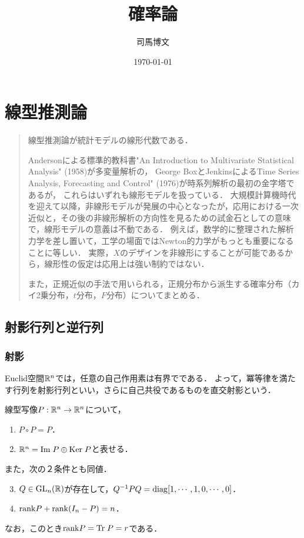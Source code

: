 \documentclass[uplatex,dvipdfmx]{jsreport}
\title{確率論}
\author{司馬博文}
\date{\today}
\begin{document}
\tableofcontents

\chapter{線型推測論}

\begin{quotation}
    線型推測論が統計モデルの線形代数である．

    Andersonによる標準的教科書"An Introduction to Multivariate Statistical Analysis" (1958)が多変量解析の，
    George BoxとJenkinsによるTime Series Analysis, Forecasting and Control" (1976)が時系列解析の最初の金字塔であるが，
    これらはいずれも線形モデルを扱っている．
    大規模計算機時代を迎えて以降，非線形モデルが発展の中心となったが，応用における一次近似と，その後の非線形解析の方向性を見るための試金石としての意味で，線形モデルの意義は不動である．
    例えば，数学的に整理された解析力学を差し置いて，工学の場面ではNewton的力学がもっとも重要になることに等しい．
    実際，$X$のデザインを非線形にすることが可能であるから，線形性の仮定は応用上は強い制約ではない．

    また，正規近似の手法で用いられる，正規分布から派生する確率分布（カイ2乗分布，$t$分布，$F$分布）についてまとめる．
\end{quotation}

\section{射影行列と逆行列}

\subsection{射影}

\begin{tcolorbox}[colframe=ForestGreen, colback=ForestGreen!10!white,breakable,colbacktitle=ForestGreen!40!white,coltitle=black,fonttitle=\bfseries\sffamily,
title=]
    Euclid空間$\mathbb{R}^n$では，任意の自己作用素は有界でである．
    よって，冪等律を満たす行列を射影行列といい，さらに自己共役であるものを直交射影という．
\end{tcolorbox}

\begin{lemma}[射影の特徴付け]
    線型写像$P:\mathbb{R}^n\to\mathbb{R}^n$について，
    \begin{enumerate}
        \item $P\circ P=P$．
        \item $\mathbb{R}^n=\mathrm{Im}\; P\oplus\mathrm{Ker}\; P$と表せる．
    \end{enumerate}
    また，次の２条件とも同値．
    \begin{enumerate}\setcounter{enumi}{2}
        \item $Q\in\mathrm{GL}_n(\mathbb{R})$が存在して，$Q^{-1}PQ=\mathrm{diag}[1,\cdots,1,0,\cdots,0]$．
        \item $\mathrm{rank} P+\mathrm{rank}(I_n-P)=n$．
    \end{enumerate}
    なお，このとき$\mathrm{rank} P=\mathrm{Tr}\; P=r$である．
\end{lemma}
\end{document}
